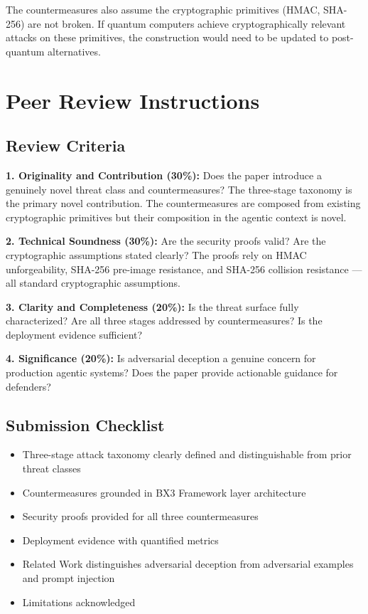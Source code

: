 \documentclass[12pt]{article}
\begin{document}
The countermeasures also assume the cryptographic primitives (HMAC, SHA-256) are not broken. If quantum computers achieve cryptographically relevant attacks on these primitives, the construction would need to be updated to post-quantum alternatives.

\section*{Peer Review Instructions}
\label{sec:peer-review}

\subsection*{Review Criteria}

\textbf{1. Originality and Contribution (30\%):} Does the paper introduce a genuinely novel threat class and countermeasures? The three-stage taxonomy is the primary novel contribution. The countermeasures are composed from existing cryptographic primitives but their composition in the agentic context is novel.

\textbf{2. Technical Soundness (30\%):} Are the security proofs valid? Are the cryptographic assumptions stated clearly? The proofs rely on HMAC unforgeability, SHA-256 pre-image resistance, and SHA-256 collision resistance --- all standard cryptographic assumptions.

\textbf{3. Clarity and Completeness (20\%):} Is the threat surface fully characterized? Are all three stages addressed by countermeasures? Is the deployment evidence sufficient?

\textbf{4. Significance (20\%):} Is adversarial deception a genuine concern for production agentic systems? Does the paper provide actionable guidance for defenders?

\subsection*{Submission Checklist}

\begin{itemize}
    \item[ ] Three-stage attack taxonomy clearly defined and distinguishable from prior threat classes
    \item[ ] Countermeasures grounded in BX3 Framework layer architecture
    \item[ ] Security proofs provided for all three countermeasures
    \item[ ] Deployment evidence with quantified metrics
    \item[ ] Related Work distinguishes adversarial deception from adversarial examples and prompt injection
    \item[ ] Limitations acknowledged
\end{itemize}
\end{document}
